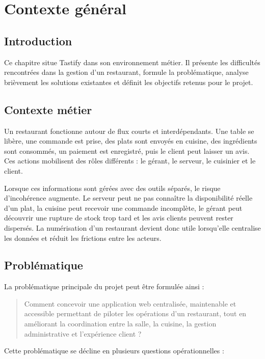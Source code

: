 \chapter{Contexte général}
\label{chap:contexte}

\section*{Introduction}
Ce chapitre situe Tastify dans son environnement métier. Il présente les difficultés rencontrées dans la gestion d'un restaurant, formule la problématique, analyse brièvement les solutions existantes et définit les objectifs retenus pour le projet.

\section{Contexte métier}
Un restaurant fonctionne autour de flux courts et interdépendants. Une table se libère, une commande est prise, des plats sont envoyés en cuisine, des ingrédients sont consommés, un paiement est enregistré, puis le client peut laisser un avis. Ces actions mobilisent des rôles différents : le gérant, le serveur, le cuisinier et le client.

Lorsque ces informations sont gérées avec des outils séparés, le risque d'incohérence augmente. Le serveur peut ne pas connaître la disponibilité réelle d'un plat, la cuisine peut recevoir une commande incomplète, le gérant peut découvrir une rupture de stock trop tard et les avis clients peuvent rester dispersés. La numérisation d'un restaurant devient donc utile lorsqu'elle centralise les données et réduit les frictions entre les acteurs.

\section{Problématique}
La problématique principale du projet peut être formulée ainsi :

\begin{quote}
Comment concevoir une application web centralisée, maintenable et accessible permettant de piloter les opérations d'un restaurant, tout en améliorant la coordination entre la salle, la cuisine, la gestion administrative et l'expérience client ?
\end{quote}

Cette problématique se décline en plusieurs questions opérationnelles :

